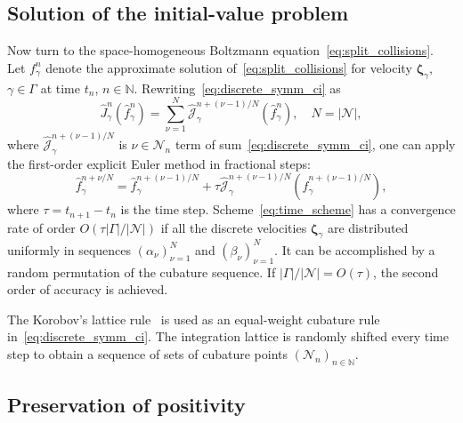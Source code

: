 \documentclass[]{elsarticle} %
\newcommand{\bzeta}{\boldsymbol{\zeta}}
\newcommand{\Nu}{\mathcal{N}}
\newcommand{\OO}[1]{O(#1)}
\begin{document}
\subsection{Solution of the initial-value problem}

Now turn to the space-homogeneous Boltzmann equation~\eqref{eq:split_collisions}.
Let \(f_\gamma^n\) denote the approximate solution of~\eqref{eq:split_collisions}
for velocity \(\bzeta_\gamma\), \(\gamma\in\Gamma\) at time \(t_n\), \(n\in\mathbb{N}\).
Rewriting~\eqref{eq:discrete_symm_ci} as
\begin{equation}\label{eq:discrete_short_ci}
    \hat{J}_\gamma^n\left(\hat{f}_\gamma^n\right) =
        \sum_{\nu=1}^N \hat{\mathscr{J}}_\gamma^{n+(\nu-1)/N} \left(\hat{f}_\gamma^n\right), \quad
    N=|\Nu|,
\end{equation}
where \(\hat{\mathscr{J}}_\gamma^{n+(\nu-1)/N}\) is \(\nu\in\Nu_n\) term of sum~\eqref{eq:discrete_symm_ci},
one can apply the first-order explicit Euler method in fractional steps:
\begin{equation}\label{eq:time_scheme}
    \hat{f}_\gamma^{n+\nu/N} = \hat{f}_\gamma^{n+(\nu-1)/N} + \tau \hat{\mathscr{J}}_\gamma^{n+(\nu-1)/N}
    \left(\hat{f}_\gamma^{n+(\nu-1)/N}\right),
\end{equation}
where \(\tau = t_{n+1} - t_n\) is the time step.
Scheme~\eqref{eq:time_scheme} has a convergence rate of order \(\OO{\tau|\Gamma|/|\Nu|}\)
if all the discrete velocities \(\bzeta_\gamma\) are distributed uniformly
in sequences \((\alpha_\nu)_{\nu=1}^N\) and \((\beta_\nu)_{\nu=1}^N\).
It can be accomplished by a random permutation of the cubature sequence.
If \(|\Gamma|/|\Nu| = \OO{\tau}\), the second order of accuracy is achieved.

The Korobov's lattice rule~\citep{Korobov1959, Sloan1994} is used as
an equal-weight cubature rule in~\eqref{eq:discrete_symm_ci}.
The integration lattice is randomly shifted every time step
to obtain a sequence of sets of cubature points \((\Nu_n)_{n\in\mathbb{N}}\).

\subsection{Preservation of positivity}
\end{document}
